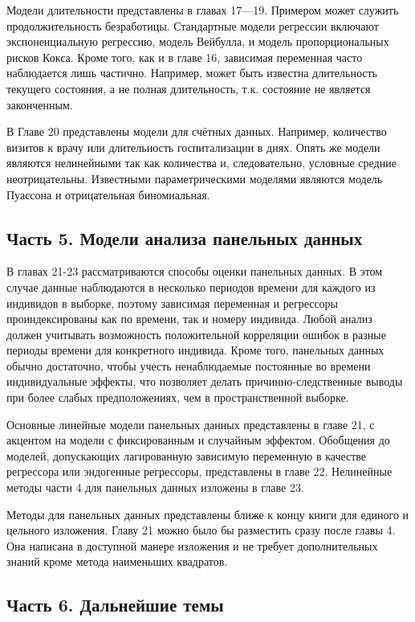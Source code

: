 	
Модели длительности представлены в главах 17---19. Примером может служить продолжительность безработицы. Стандартные модели регрессии включают экспоненциальную регрессию, модель Вейбулла, и модель пропорциональных рисков Кокса. Кроме того, как и в главе 16, зависимая переменная часто наблюдается лишь частично. Например, может быть известна длительность текущего состояния, а не полная длительность, т.к. состояние не является законченным.
	
	
В Главе 20 представлены  модели для счётных данных. Например, количество визитов к врачу или длительность госпитализации в днях. Опять же модели являются нелинейными так как количества и, следовательно, условные средние неотрицательны. Известными параметрическими моделями являются модель Пуассона и отрицательная биномиальная.

\subsection{Часть 5. Модели анализа панельных данных}

В главах 21-23 рассматриваются способы оценки панельных данных. В этом случае данные наблюдаются в несколько периодов времени для каждого из индивидов в выборке, поэтому зависимая переменная и регрессоры проиндексированы как по времени, так и номеру индивида. Любой анализ должен учитывать возможность положительной корреляции ошибок в разные периоды времени для конкретного индивида. Кроме того, панельных данных обычно достаточно, чтобы учесть ненаблюдаемые постоянные во времени индивидуальные  эффекты, что позволяет делать причинно-следственные выводы при более слабых предположениях, чем  в пространственной выборке.


Основные линейные модели панельных данных представлены в главе 21, с акцентом на модели с фиксированным и случайным эффектом. Обобщения до моделей, допускающих лагированную зависимую переменную в качестве регрессора или эндогенные регрессоры, представлены в главе 22.  Нелинейные методы части 4 для панельных данных изложены в главе 23.


Методы для панельных данных представлены ближе к концу книги для единого и цельного изложения. Главу 21 можно было бы разместить сразу после главы 4. Она написана в доступной манере изложения и не требует дополнительных знаний кроме метода наименьших квадратов.

\subsection{Часть 6. Дальнейшие темы}

